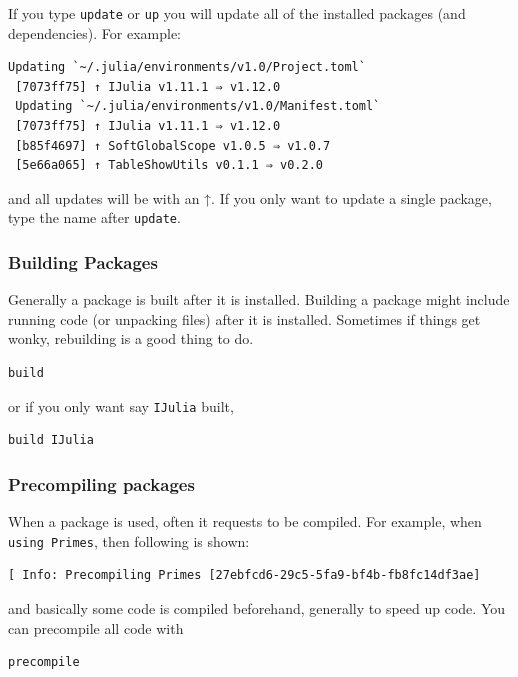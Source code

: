 If you type \texttt{update} or \texttt{up} you will update all of the
installed packages (and dependencies). For example:

\begin{verbatim}
Updating `~/.julia/environments/v1.0/Project.toml`
 [7073ff75] ↑ IJulia v1.11.1 ⇒ v1.12.0
 Updating `~/.julia/environments/v1.0/Manifest.toml`
 [7073ff75] ↑ IJulia v1.11.1 ⇒ v1.12.0
 [b85f4697] ↑ SoftGlobalScope v1.0.5 ⇒ v1.0.7
 [5e66a065] ↑ TableShowUtils v0.1.1 ⇒ v0.2.0
\end{verbatim}

and all updates will be with an ↑. If you only want to update a single
package, type the name after \texttt{update}.

\hypertarget{building-packages}{%
\subsubsection{Building Packages}\label{building-packages}}

Generally a package is built after it is installed. Building a package
might include running code (or unpacking files) after it is installed.
Sometimes if things get wonky, rebuilding is a good thing to do.

\begin{verbatim}
build
\end{verbatim}

or if you only want say \texttt{IJulia} built,

\begin{verbatim}
build IJulia
\end{verbatim}

\subsubsection{Precompiling packages}

When a package is used, often it requests to be compiled. For example,
when \texttt{using\ Primes}, then following is shown:

\begin{verbatim}
[ Info: Precompiling Primes [27ebfcd6-29c5-5fa9-bf4b-fb8fc14df3ae]
\end{verbatim}

and basically some code is compiled beforehand, generally to speed up
code. You can precompile all code with

\begin{verbatim}
precompile
\end{verbatim}

